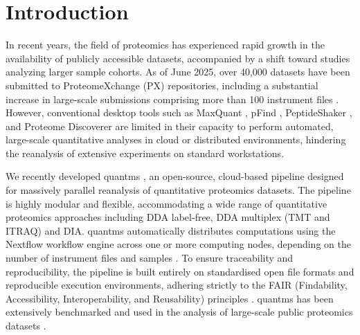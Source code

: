 \documentclass[12pt]{article}
\begin{document}
\section{Introduction}
In recent years, the field of proteomics has experienced rapid growth in the availability of publicly accessible datasets, accompanied by a shift toward studies analyzing larger sample cohorts. As of June 2025, over 40,000 datasets have been submitted to ProteomeXchange (PX) repositories, including a substantial increase in large-scale submissions comprising more than 100 instrument files \cite{perez-riverol_pride_2025}. However, conventional desktop tools such as MaxQuant \cite{cox_maxquant_2008}, pFind \cite{wang_pfind_2007}, PeptideShaker \cite{vaudel2015peptideshaker}, and Proteome Discoverer are limited in their capacity to perform automated, large-scale quantitative analyses in cloud or distributed environments, hindering the reanalysis of extensive experiments on standard workstations. %


We recently developed quantms \cite{dai_quantms_2024}, an open-source, cloud-based pipeline designed for massively parallel reanalysis of quantitative proteomics datasets. The pipeline is highly modular and flexible, accommodating a wide range of quantitative proteomics approaches including DDA label-free, DDA multiplex (TMT and ITRAQ) and DIA. %
quantms automatically distributes computations using the Nextflow workflow engine across one or more computing nodes, depending on the number of instrument files and samples \cite{di_tommaso_nextflow_2017}. To ensure traceability and reproducibility, the pipeline is built entirely on standardised open file formats and reproducible execution environments, adhering strictly to the FAIR (Findability, Accessibility, Interoperability, and Reusability) principles \cite{wilkinson_fair_2016}. quantms has been extensively benchmarked and used in the analysis of large-scale public proteomics datasets \cite{dai_quantms_2024,bai2023lfq, ZHENG2025105440}. %
\end{document}

